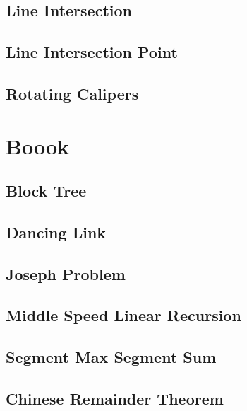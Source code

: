 \documentclass[a4paper,10pt,twocolumn,oneside]{article}
\begin{document}
\subsection{Line Intersection}


\subsection{Line Intersection Point}


\subsection{Rotating Calipers}



\section{Boook}

\subsection{Block Tree}


\subsection{Dancing Link}


\subsection{Joseph Problem}


\subsection{Middle Speed Linear Recursion}


\subsection{Segment Max Segment Sum}


\subsection{Chinese Remainder Theorem}

\end{document}
